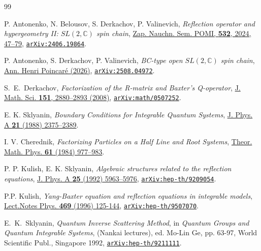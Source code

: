\documentclass[a4paper,11pt]{article}
\numberwithin{equation}{section}
\begin{document}
\begin{thebibliography}{99}

 P. Antonenko, N. Belousov, S. Derkachov, P. Valinevich,  \textit{Reflection operator and hypergeometry II: $SL(2, \mathbb{C})$ spin chain}, \href{https://www.mathnet.ru/php/archive.phtml?wshow=paper&jrnid=znsl&paperid=7451&option_lang=eng}{Zap. Nauchn. Sem. POMI, \textbf{532}, 2024, 47–79}, \href{https://arxiv.org/abs/2406.19864}{\texttt{arXiv:2406.19864}}.

P. Antonenko, S. Derkachov, P. Valinevich,
\textit{BC-type open $SL(2,\mathbb{C})$ spin chain},
\href{https://link.springer.com/article/10.1007/s00023-025-01653-0}{Ann. Henri Poincar\'e (2026)},
\href{https://arxiv.org/abs/2508.04972}{\texttt{arXiv:2508.04972}}.

S.~E.~Derkachov,
\textit{Factorization of the R-matrix and Baxter’s Q-operator},
\href{https://link.springer.com/article/10.1007/s10958-008-9010-x}{J. Math. Sci. \textbf{151}, 2880–2893 (2008)},
\href{https://arxiv.org/abs/math/0507252}{\texttt{arXiv:math/0507252}}.


E. K. Sklyanin, \textit{Boundary Conditions for Integrable Quantum Systems}, \href{https://doi.org/10.1088/0305-4470/21/10/015}{J. Phys. A \textbf{21} (1988) 2375--2389}.

 I. V. Cherednik, \textit{Factorizing Particles on a Half Line and Root Systems}, \href{https://doi.org/10.1007/BF01038545}{Theor. Math. Phys. \textbf{61} (1984) 977--983}.

 P. P. Kulish, E. K. Sklyanin, \textit{Algebraic structures related to the reflection equations}, \href{https://doi.org/10.1088/0305-4470/25/22/022}{J. Phys. A \textbf{25} (1992) 5963--5976}, \href{https://arxiv.org/abs/hep-th/9209054}{\texttt{arXiv:hep-th/9209054}}.

P.P. Kulish, 
\textit{Yang-Baxter equation and reflection equations in integrable models},
\href{https://doi.org/10.1007/BFb0102555}{Lect.Notes Phys. \textbf{469} (1996) 125-144},
\href{https://doi.org/10.48550/arXiv.hep-th/9507070}{\tt \href{https://arxiv.org/abs/hep-th/9507070}{\texttt{arXiv:hep-th/9507070}}}.


E.~K.~Sklyanin,
\emph{ Quantum Inverse Scattering Method}, in
{\sl Quantum Groups and Quantum Integrable Systems}, (Nankai
lectures), ed. Mo-Lin Ge, pp. 63-97, World Scientific Publ.,
Singapore 1992,
\href{https://arxiv.org/abs/hep-th/9211111}{\texttt{arXiv:hep-th/9211111}}.


\end{thebibliography}
\end{document}
